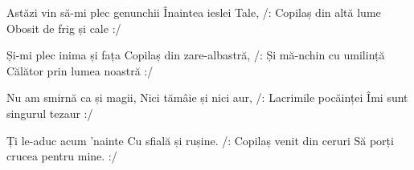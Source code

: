 
\beginverse
Astăzi vin să-mi plec genunchii
Înaintea ieslei Tale,
/: Copilaș din altă lume
Obosit de frig și cale :/
\endverse

\beginverse
Și-mi plec inima și fața
Copilaș din zare-albastră,
/: Și mă-nchin cu umilință
Călător prin lumea noastră :/
\endverse

\beginverse
Nu am smirnă ca și magii,
Nici tămâie și nici aur,
/: Lacrimile pocăinței
Îmi sunt singurul tezaur :/
\endverse

\beginverse
Ți le-aduc acum 'nainte
Cu sfială și rușine.
/: Copilaș venit din ceruri
Să porți crucea pentru mine. :/
\endverse

\endsong